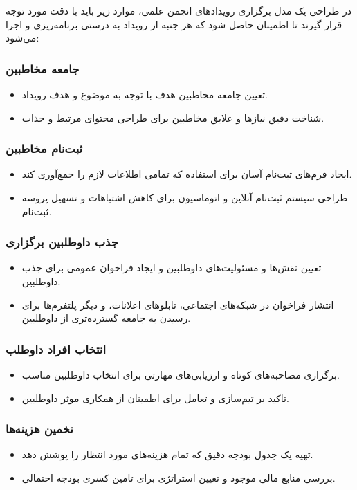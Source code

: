 در طراحی یک مدل برگزاری رویدادهای انجمن علمی، موارد زیر باید با دقت مورد توجه قرار گیرند تا اطمینان حاصل شود که هر جنبه از رویداد به درستی برنامه‌ریزی و اجرا می‌شود:

\subsubsection*{جامعه مخاطبین}
\begin{itemize}
	\item تعیین جامعه مخاطبین هدف با توجه به موضوع و هدف رویداد.
	\item شناخت دقیق نیازها و علایق مخاطبین برای طراحی محتوای مرتبط و جذاب.
\end{itemize}

\subsubsection*{ثبت‌نام مخاطبین}
\begin{itemize}
	\item ایجاد فرم‌های ثبت‌نام آسان برای استفاده که تمامی اطلاعات لازم را جمع‌آوری کند.
	\item طراحی سیستم ثبت‌نام آنلاین و اتوماسیون برای کاهش اشتباهات و تسهیل پروسه ثبت‌نام.
\end{itemize}

\subsubsection*{جذب داوطلبین برگزاری}
\begin{itemize}
	\item تعیین نقش‌ها و مسئولیت‌های داوطلبین و ایجاد فراخوان عمومی برای جذب داوطلبین.
	\item انتشار فراخوان در شبکه‌های اجتماعی، تابلوهای اعلانات، و دیگر پلتفرم‌ها برای رسیدن به جامعه گسترده‌تری از داوطلبین.
\end{itemize}

\subsubsection*{انتخاب افراد داوطلب}
\begin{itemize}
	\item برگزاری مصاحبه‌های کوتاه و ارزیابی‌های مهارتی برای انتخاب داوطلبین مناسب.
	\item تاکید بر تیم‌سازی و تعامل برای اطمینان از همکاری موثر داوطلبین.
\end{itemize}

\subsubsection*{تخمین هزینه‌ها}
\begin{itemize}
	\item تهیه یک جدول بودجه دقیق که تمام هزینه‌های مورد انتظار را پوشش دهد.
	\item بررسی منابع مالی موجود و تعیین استراتژی برای تامین کسری بودجه احتمالی.
\end{itemize}

